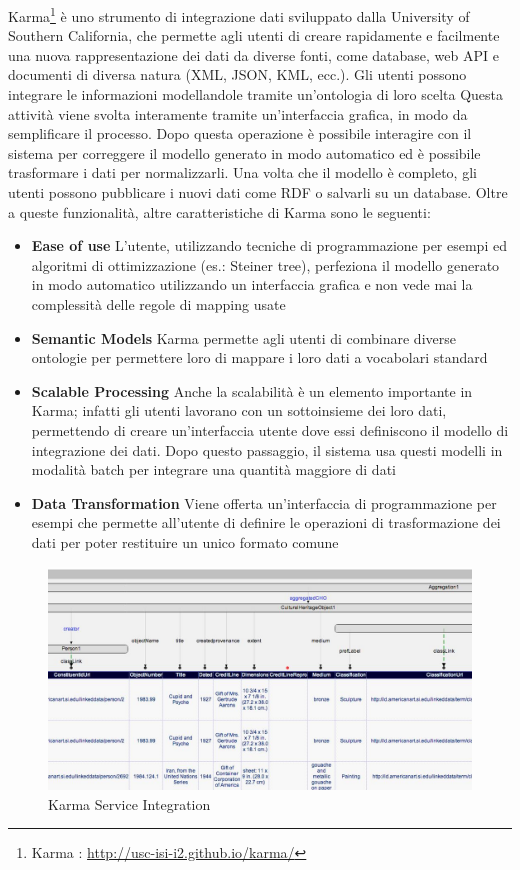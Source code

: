 Karma\footnote{Karma : \url{http://usc-isi-i2.github.io/karma/}} è uno strumento di integrazione dati sviluppato dalla University of Southern California, che permette agli utenti di creare rapidamente e facilmente una nuova rappresentazione dei dati  da diverse fonti, come database, web API e documenti di diversa natura (XML, JSON, KML, ecc.). Gli utenti possono integrare le informazioni modellandole tramite un'ontologia di loro scelta Questa attività viene svolta interamente tramite un'interfaccia grafica, in modo da semplificare il processo. 
Dopo questa operazione è possibile interagire con il sistema per correggere il modello generato in modo automatico ed è possibile trasformare i dati per normalizzarli. Una volta che il modello è completo, gli utenti possono pubblicare i nuovi dati come RDF o salvarli su un database.
Oltre a queste funzionalità, altre caratteristiche di Karma sono le seguenti: 
\begin{itemize}
		\item \textbf{Ease of use} L'utente, utilizzando tecniche di programmazione per esempi ed algoritmi  di ottimizzazione (es.: Steiner tree), perfeziona il modello generato in modo automatico utilizzando un interfaccia grafica e non vede mai la complessità delle regole di mapping usate
		\item \textbf{Semantic Models} Karma permette agli utenti di combinare diverse ontologie per permettere loro di mappare i loro dati a vocabolari standard
		\item \textbf{Scalable Processing} Anche la scalabilità è un elemento importante in Karma; infatti gli utenti lavorano con un sottoinsieme dei loro dati, permettendo di creare un'interfaccia utente dove essi definiscono il modello di integrazione dei dati. Dopo questo passaggio, il sistema usa questi modelli in modalità batch per integrare una quantità maggiore di dati
		\item \textbf{Data Transformation} Viene offerta un'interfaccia di programmazione per esempi che permette all'utente di definire le operazioni di trasformazione dei dati per poter restituire un unico formato comune
\end{itemize}

\begin{figure}[ht]
	\centering
	\includegraphics[width=\textwidth]{2-nozioni-preliminari/Immagini/karma-europeana.jpg}
	\caption{Karma Service Integration}\label{fig:karma-europeana}
\end{figure}

